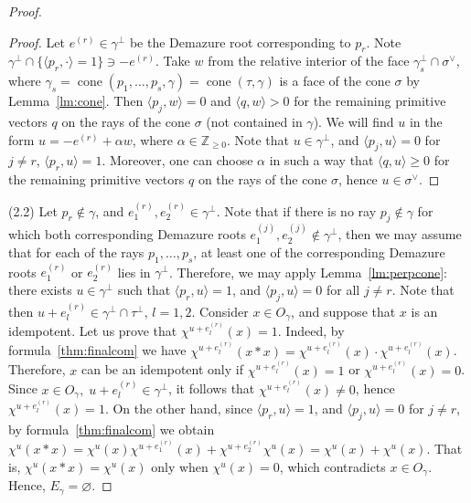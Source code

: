 \documentclass[a4paper, 11pt]{amsart}
\theoremstyle{plain}
\theoremstyle{remark}
\theoremstyle{definition}
\newcommand{\ZZ}{\mathbb{Z}}
\DeclareMathOperator{\cone}{cone}
\begin{document}
\begin{proof}
\begin{proof}
Let $e^{(r)} \in \gamma^\perp$ be the Demazure root corresponding to $p_r$. Note $\gamma^\perp \cap \{ \langle p_r, \cdot \rangle = 1\} \ni -e^{(r)}$. Take $w$ from the relative interior of the face $\gamma_s^\perp \cap \sigma^\vee$, where $\gamma_s = \cone(p_1, \ldots, p_s, \gamma) = \cone(\tau, \gamma)$ is a face of the cone $\sigma$ by Lemma~\ref{lm:cone}. Then $\langle p_j, w \rangle = 0$ and $\langle q, w \rangle > 0$ for the remaining primitive vectors $q$ on the rays of the cone $\sigma$ (not contained in $\gamma$). We will find $u$ in the form $u = -e^{(r)} + \alpha w$, where $\alpha \in \ZZ_{\geq 0}$. Note that $u \in \gamma^\perp$, and $\langle p_j, u \rangle = 0$ for $j \neq r$, $\langle p_r, u \rangle = 1$. Moreover, one can choose $\alpha$ in such a way that $\langle q, u \rangle \geq 0$ for the remaining primitive vectors $q$ on the rays of the cone $\sigma$, hence $u \in \sigma^\vee$.
\end{proof}

(2.2) Let $p_r \notin \gamma$, and $e_1^{(r)}, e_2^{(r)} \in \gamma^\perp$. Note that if there is no ray $p_j \notin \gamma$ for which both corresponding Demazure roots $e_1^{(j)}, e_2^{(j)} \notin \gamma^\perp$, then we may assume that for each of the rays $p_1, \ldots, p_s$, at least one of the corresponding Demazure roots $e_1^{(r)}$ or $e_2^{(r)}$ lies in $\gamma^\perp$. Therefore, we may apply Lemma~\ref{lm:perpcone}: there exists $u \in \gamma^\perp$ such that $\langle p_r, u \rangle = 1$, and $\langle p_j, u \rangle = 0$ for all $j \neq r$. Note that then $u + e_l^{(r)} \in \gamma^\perp \cap \tau^\perp$, $l = 1, 2$. Consider $x \in O_\gamma$, and suppose that $x$ is an idempotent. Let us prove that $\chi^{u + e_l^{(r)}}(x) = 1$. Indeed, by formula~\eqref{thm:finalcom} we have $\chi^{u + e_l^{(r)}}(x*x) = \chi^{u + e_l^{(r)}}(x)\cdot\chi^{u + e_l^{(r)}}(x)$. Therefore, $x$ can be an idempotent only if ${\chi^{u + e_l^{(r)}}(x) = 1}$ or $\chi^{u + e_l^{(r)}}(x) = 0$. Since $x \in O_\gamma,\; u + e_l^{(r)} \in \gamma^\perp$, it follows that $\chi^{u + e_l^{(r)}}(x) \neq 0$, hence ${\chi^{u + e_l^{(r)}}(x) = 1}$. On the other hand, since $\langle p_r, u \rangle = 1$, and $\langle p_j, u \rangle = 0$ for $j \neq r$, by formula~\eqref{thm:finalcom} we obtain $\chi^u(x*x) = \chi^u(x)\chi^{u + e_1^{(r)}}(x) + \chi^{u + e_2^{(r)}}\chi^u(x) = \chi^u(x) + \chi^u(x)$. That is, $\chi^u(x*x) = \chi^u(x)$ only when $\chi^u(x) = 0$, which contradicts $x \in O_\gamma$. Hence, $E_\gamma = \varnothing$.


\end{proof}
\end{document}
